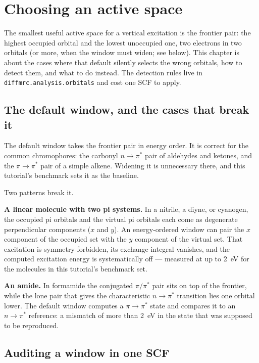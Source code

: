 \section{Choosing an active space}
\label{sec:active-space}

The smallest useful active space for a vertical excitation is the
frontier pair: the highest occupied orbital and the lowest unoccupied
one, two electrons in two orbitals (or more, when the window must
widen; see below).  This chapter is about the cases where that default
silently selects the wrong orbitals, how to detect them, and what to
do instead.  The detection rules live in
\texttt{diffmrc.analysis.orbitals} and cost one SCF to apply.

\subsection{The default window, and the cases that break it}

The default window takes the frontier pair in energy order.  It is
correct for the common chromophores: the carbonyl $n \to \pi^*$ pair
of aldehydes and ketones, and the $\pi \to \pi^*$ pair of a simple
alkene.  Widening it is unnecessary there, and this tutorial's
benchmark sets it as the baseline.

Two patterns break it.

\textbf{A linear molecule with two pi systems.}  In a nitrile, a
diyne, or cyanogen, the occupied pi orbitals and the virtual pi
orbitals each come as degenerate perpendicular components ($x$ and
$y$).  An energy-ordered window can pair the $x$ component of the
occupied set with the $y$ component of the virtual set.  That
excitation is symmetry-forbidden, its exchange integral vanishes, and
the computed excitation energy is systematically off --- measured at
up to 2~eV for the molecules in this tutorial's benchmark set.

\textbf{An amide.}  In formamide the conjugated $\pi/\pi^*$ pair
sits on top of the frontier, while the lone pair that gives the
characteristic $n \to \pi^*$ transition lies one orbital lower.  The
default window computes a $\pi \to \pi^*$ state and compares it to an
$n \to \pi^*$ reference: a mismatch of more than 2~eV in the state
that was supposed to be reproduced.

\subsection{Auditing a window in one SCF}

